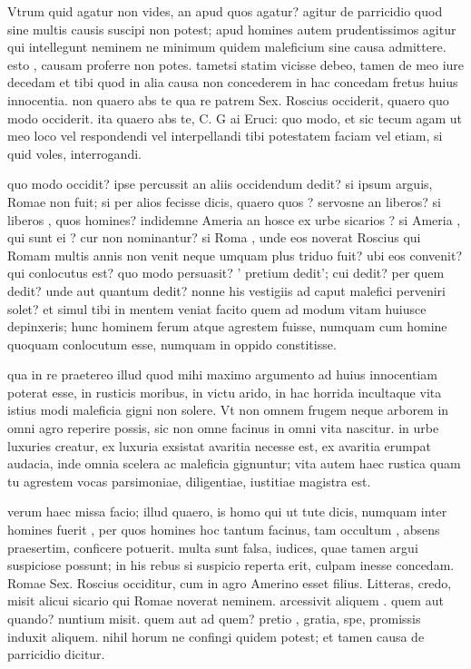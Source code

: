  Vtrum quid agatur non vides, an apud quos agatur? agitur de parricidio quod sine multis causis suscipi non potest; apud homines autem prudentissimos agitur qui intellegunt neminem ne minimum quidem maleficium sine causa admittere. esto , causam proferre non potes. tametsi statim vicisse debeo, tamen de meo iure decedam et tibi quod in alia causa non concederem in hac concedam fretus huius innocentia. non quaero abs te qua re patrem Sex. Roscius occiderit, quaero quo modo occiderit. ita quaero abs te, C. G ai Eruci: quo modo, et sic tecum agam ut meo loco vel respondendi vel interpellandi tibi potestatem faciam vel etiam, si quid voles, interrogandi.

 quo modo occidit? ipse percussit an aliis occidendum dedit? si ipsum arguis, Romae non fuit; si per alios fecisse dicis, quaero quos ? servosne an liberos? si liberos , quos homines? indidemne Ameria an hosce ex urbe sicarios ? si Ameria , qui sunt ei ? cur non nominantur? si Roma , unde eos noverat Roscius qui Romam multis annis non venit neque umquam plus triduo fuit? ubi eos convenit? qui conlocutus est? quo modo persuasit? ' pretium dedit'; cui dedit? per quem dedit? unde aut quantum dedit? nonne his vestigiis ad caput malefici perveniri solet? et simul tibi in mentem veniat facito quem ad modum vitam huiusce depinxeris; hunc hominem ferum atque agrestem fuisse, numquam cum homine quoquam conlocutum esse, numquam in oppido constitisse.

 qua in re praetereo illud quod mihi maximo argumento ad huius innocentiam poterat esse, in rusticis moribus, in victu arido, in hac horrida incultaque vita istius modi maleficia gigni non solere. Vt non omnem frugem neque arborem in omni agro reperire possis, sic non omne facinus in omni vita nascitur. in urbe luxuries creatur, ex luxuria exsistat avaritia necesse est, ex avaritia erumpat audacia, inde omnia scelera ac maleficia gignuntur; vita autem haec rustica quam tu agrestem vocas parsimoniae, diligentiae, iustitiae magistra est.

 verum haec missa facio; illud quaero, is homo qui ut tute dicis, numquam inter homines fuerit , per quos homines hoc tantum facinus, tam occultum , absens praesertim, conficere potuerit. multa sunt falsa, iudices, quae tamen argui suspiciose possunt; in his rebus si suspicio reperta erit, culpam inesse concedam. Romae Sex. Roscius occiditur, cum in agro Amerino esset filius. Litteras, credo, misit alicui sicario qui Romae noverat neminem. arcessivit aliquem . quem aut quando? nuntium misit. quem aut ad quem? pretio , gratia, spe, promissis induxit aliquem. nihil horum ne confingi quidem potest; et tamen causa de parricidio dicitur.

